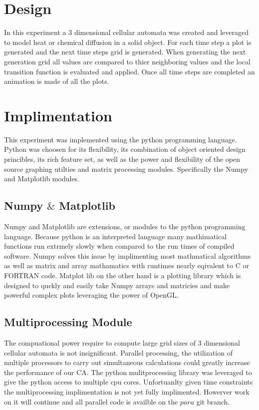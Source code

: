 \documentclass[11pt,twocolumn]{article}
\begin{document}
\section{Design}
In this experiment a 3 dimensional cellular automata was created and leveraged to model heat or chemical diffusion in a solid object. 
For each time step a plot is generated and the next time steps grid is generated. When generating the next generation grid all values 
are compared to thier neighboring values and the local transition function is evaluated and applied. Once all time steps are completed an animation is made of all the plots.
\section{Implimentation} 
This experiment was implemented using the python programming language. 
Python was choosen for its flexibility, its combination of object oriented design princibles, its rich feature set, 
as well as the power and flexibility of the open source graphing utilties and matrix processing modules. 
Specifically the Numpy and Matplotlib modules.

\subsection{Numpy $\&$ Matplotlib }
Numpy and Matplotlib are extensions, or modules to the python programming language. Because python is an interpreted language 
many mathimatical functions run extrmely slowly when compared to the run times of compiled software. 
Numpy solves this issue by implimenting most mathmatical algorithms as well as matrix and array mathamatics with runtimes nearly eqivalent to C or FORTRAN code.\cite{mplot} 
Matplot lib on the other hand is a plotting library which is designed to quckly and easily take Numpy arrays and matricies and make powerful complex plots leveraging the power of OpenGL.\cite{numpy} 

\subsection{Multiprocessing Module}
The compuational power require to compute large grid sizes of 3 dimensional cellular automata is not insignificant. Parallel processing, the utilization of multiple processors to carry out simultaneous calculations could greatly increase the performance of our CA. The python mulitprocessing library was leveraged to give the python access to multiple cpu cores. Unfortuanlty given time constraints the multiprocessing implimentation is not yet fully implimented. Howerver work on it will continue and all parallel code is availble on the $para$ git branch.
\end{document}
